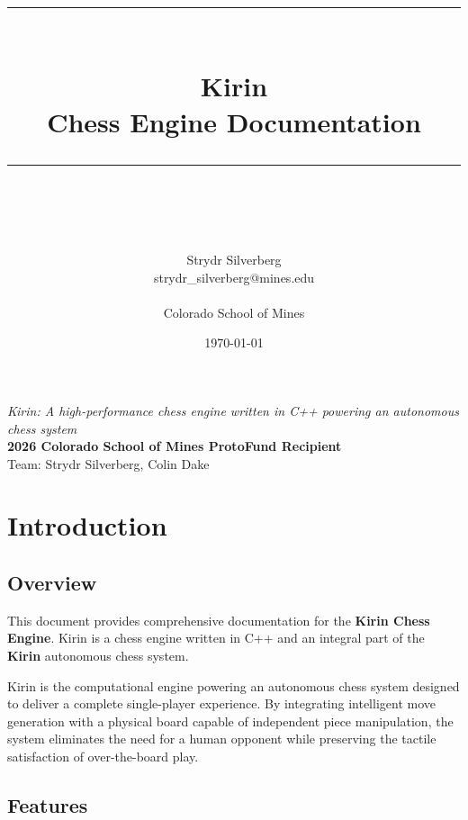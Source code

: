 \documentclass[11pt,a4paper]{report}
\title{%
    \vspace{-1cm}
    \rule{\textwidth}{1pt}\\[0.5cm]
    {\Huge\bfseries Kirin}\\[0.3cm]
    {\Large Chess Engine Documentation}\\[0.3cm]
    \rule{\textwidth}{1pt}\\[1cm]
}
\author{Strydr Silverberg\\strydr\_silverberg@mines.edu\\\\Colorado School of Mines}
\date{\today}
\begin{document}
\maketitle
\thispagestyle{empty}

\vfill
\begin{center}
    \textit{Kirin: A high-performance chess engine written in C++ powering an autonomous chess system}\\[1em]
    \textbf{2026 Colorado School of Mines ProtoFund Recipient}\\
    Team: Strydr Silverberg, Colin Dake
\end{center}
\vfill

\newpage
\tableofcontents
\newpage

\chapter{Introduction}

\section{Overview}

This document provides comprehensive documentation for the \textbf{Kirin Chess Engine}. Kirin is a chess engine written in C++ and an integral part of the \textbf{Kirin} autonomous chess system.

Kirin is the computational engine powering an autonomous chess system designed to deliver a complete single-player experience. By integrating intelligent move generation with a physical board capable of independent piece manipulation, the system eliminates the need for a human opponent while preserving the tactile satisfaction of over-the-board play.

\section{Features}
\end{document}
